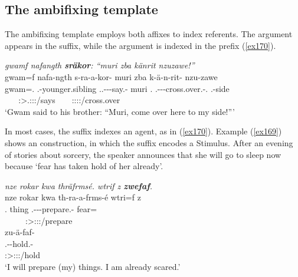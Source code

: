 \subsection{The ambifixing template} \label{ambifixingtemp}

The ambifixing template employs both affixes to index referents. The  argument appears in the suffix, while the  argument is indexed in the prefix (\ref{ex170}).

\begin{exe}
	\ex \emph{gwamf nafangth \textbf{sräkor}: ``muri zba känrit nzuzawe!''}\\
	\glll gwam=f nafa-ngth s-ra-a-kor-\Zero{} muri zba k-ä-n-rit-\Zero{} nzu-zawe\\
	gwam=\Erg.{\Sg} \Third.\Poss-younger.sibling \Tsg.\Masc.\Bet-\Irr-\Ndu-say.\Rs-\Stsg{} muri \Prox.{\Abl} \M.\Bet-\Ndu-\Venit-cross.over.\Rs-\Ssg.{\Imp} \Fsg.\Poss-side\\
	~ ~ {\footnotesize \Stsg:\Sbj>\Tsg.\Masc:\Obj:\Irr:\Pfv/says} ~ ~ {\footnotesize \Ssg:\Sbj:\Imp:\Pfv:\Venit/cross.over} ~\\
	\trans `Gwam said to his brother: ``Muri, come over here to my side!'''\\ 
	\label{ex170}
\end{exe}

In most cases, the suffix indexes an agent, as in (\ref{ex170}). Example (\ref{ex169}) shows an  construction, in which the suffix encodes a Stimulus. After an evening of stories about sorcery, the speaker announces that she will go to sleep now because `fear has taken hold of her already'.

\begin{exe}
	\ex \emph{nze rokar kwa thräfrmsé. wtrif z \textbf{zwefaf}.}\\
	\glll nze rokar kwa th-ra-a-frms-é wtri=f z\\
	\Fsg.{\Erg} thing {\Fut} \Stnsg.\Bet-\Irr-\Vc\textbar\Ndu-prepare.\Rs-\Fsg{} fear={\Erg} {\Iam}\\
	~ ~ ~ {\footnotesize \Fsg:\Sbj>\Stpl:\Obj:\Irr:\Pfv/prepare} ~ ~\\
	\sn
	\glll zu-ä-faf-\Zero\\
	\Fsg.\Gam-\Ndu-hold.\Rs-\Stsg{}\\
	{\footnotesize \Stsg:\Sbj>\Fsg:\Obj:\Rpst:\Pfv/hold}\\
	\trans `I will prepare (my) things. I am already scared.' 
	\label{ex169}
\end{exe}

